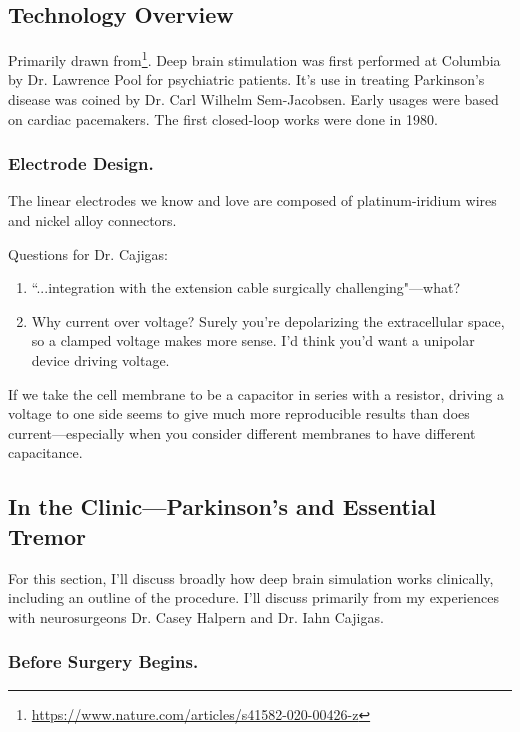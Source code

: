 \documentclass[12pt]{report}
\begin{document}
\subsection{Technology Overview}

Primarily drawn from\footnote{\url{https://www.nature.com/articles/s41582-020-00426-z}}. Deep brain stimulation was first performed at Columbia by Dr. Lawrence Pool for psychiatric patients. It's use in treating Parkinson's disease was coined by Dr. Carl Wilhelm Sem-Jacobsen. Early usages were based on cardiac pacemakers. The first closed-loop works were done in 1980.

\subsubsection{Electrode Design.}

The linear electrodes we know and love are composed of platinum-iridium wires and  nickel alloy connectors. 

\color{red}
Questions for Dr. Cajigas:
\begin{enumerate}
    \itemsep 0em
    \item ``...integration with the extension cable surgically challenging"---what?
    \item Why current over voltage? Surely you're depolarizing the extracellular space, so a clamped voltage makes more sense. I'd think you'd want a unipolar device driving voltage.
\end{enumerate}
If we take the cell membrane to be a capacitor in series with a resistor, driving a voltage to one side seems to give much more reproducible results than does current---especially when you consider different membranes to have different capacitance. 


\color{black}

\subsection{In the Clinic---Parkinson's and Essential Tremor}

For this section, I'll discuss broadly how deep brain simulation works clinically, including an outline of the procedure. I'll discuss primarily from my experiences with neurosurgeons Dr. Casey Halpern and Dr. Iahn Cajigas.\newline


\subsubsection{Before Surgery Begins.}
\end{document}
